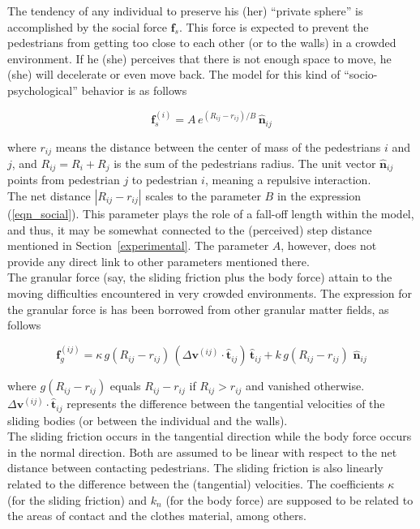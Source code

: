 \documentclass[preprint,12pt]{elsarticle}
\begin{document}
The tendency of any individual to preserve his (her) ``private sphere'' is 
accomplished by the social force $\mathbf{f}_s$. This force is expected to 
prevent the pedestrians from getting too close to each other (or to the walls) 
in a crowded environment. If he (she) perceives that there is not enough space 
to move, he (she) will decelerate or even move back. The model for this kind of 
``socio-psychological'' behavior is as follows

\begin{equation}
 \mathbf{f}_s^{(i)}=A\,e^{(R_{ij}-r_{ij})/B}\,\hat{\mathbf{n}}_{ij}
 \label{eqn_social}
\end{equation}

\noindent where $r_{ij}$ means the distance between the center of mass of the 
pedestrians $i$ and $j$, and $R_{ij}=R_i+R_j$ is the sum of the pedestrians 
radius. The unit vector $\hat{\mathbf{n}}_{ij}$ points from pedestrian $j$ to 
pedestrian $i$, meaning a repulsive interaction.\\ 

The net distance $|R_{ij}-r_{ij}|$ scales to the parameter $B$ in the 
expression (\ref{eqn_social}). This parameter plays the role of a fall-off 
length within the model, and thus, it may be somewhat connected to the 
(perceived) step distance mentioned in Section~\ref{experimental}. The 
parameter $A$, however, does not provide any direct link to other parameters 
mentioned there. \\    

The granular force (say, the sliding friction plus the body force) attain to 
the moving difficulties encountered in very crowded environments. The 
expression for the granular force is has been borrowed from other granular 
matter fields, as follows

\begin{equation}
 \mathbf{f}_g^{(ij)}=\kappa\,g(R_{ij}-r_{ij})\,
(\Delta\mathbf{v}^{(ij)}\cdot\hat{\mathbf{t}}_{ij})\,\hat{\mathbf{t}}_{ij}+
k\,g(R_{ij}-r_{ij})\,
\,\hat{\mathbf{n}}_{ij}\label{eqn_friction}
\end{equation}

\noindent where $g(R_{ij}-r_{ij})$ equals $R_{ij}-r_{ij}$ if $R_{ij}>r_{ij}$ and 
vanished otherwise. $\Delta\mathbf{v}^{(ij)}\cdot\hat{\mathbf{t}}_{ij}$ 
represents the difference between the tangential velocities of the sliding 
bodies (or between the individual and the walls).    \\

The sliding friction occurs in the tangential direction while the body force 
occurs in the normal direction. Both are assumed to be linear with respect to 
the net distance between contacting pedestrians. The sliding friction is also 
linearly related to the difference between the (tangential) velocities. The 
coefficients $\kappa$ (for the sliding friction) and $k_n$ (for the 
body force) are supposed to be related to the areas of contact and the clothes 
material, among others. \\
\end{document}
